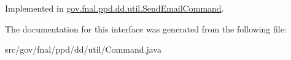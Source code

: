 Implemented in \hyperlink{classgov_1_1fnal_1_1ppd_1_1dd_1_1util_1_1SendEmailCommand_a9ee330de383feda3ef91105207351bd2}{gov.\-fnal.\-ppd.\-dd.\-util.\-Send\-Email\-Command}.



The documentation for this interface was generated from the following file\-:\begin{DoxyCompactItemize}
\item 
src/gov/fnal/ppd/dd/util/Command.\-java\end{DoxyCompactItemize}
